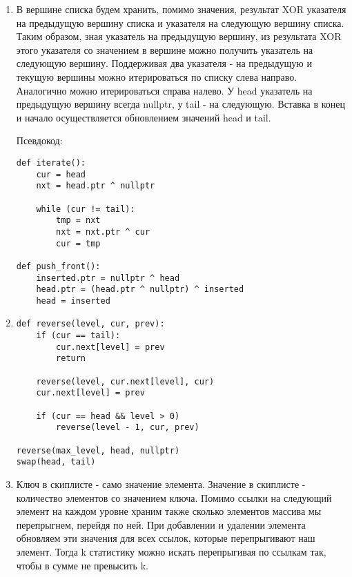 \documentclass[a4paper,12pt]{article}
\begin{document}
\lstset{language=python}

\begin{enumerate}

\item В вершине списка будем хранить, помимо значения, результат XOR указателя на предыдущую вершину списка и указателя на следующую вершину списка. Таким образом, зная указатель на предыдущую вершину, из результата XOR этого указателя со значением в вершине можно получить указатель на следующую вершину. Поддерживая два указателя - на предыдущую и текущую вершины можно итерироваться по списку слева направо. Аналогично можно итерироваться справа налево. У head указатель на предыдущую вершину всегда nullptr, у tail - на следующую.
Вставка в конец и начало осуществляется обновлением значений head и tail.

Псевдокод:
\begin{lstlisting}
def iterate():
	cur = head
	nxt = head.ptr ^ nullptr
	
	while (cur != tail):
		tmp = nxt
		nxt = nxt.ptr ^ cur
		cur = tmp
		
def push_front():
	inserted.ptr = nullptr ^ head
	head.ptr = (head.ptr ^ nullptr) ^ inserted
	head = inserted
\end{lstlisting}

\item 

\begin{lstlisting}
def reverse(level, cur, prev):
	if (cur == tail):
		cur.next[level] = prev
		return
	
	reverse(level, cur.next[level], cur)
	cur.next[level] = prev
	
	if (cur == head && level > 0)
		reverse(level - 1, cur, prev)
		
reverse(max_level, head, nullptr)
swap(head, tail)
\end{lstlisting}

\item

Ключ в скиплисте - само значение элемента. Значение в скиплисте - количество элементов со значением ключа. Помимо ссылки на следующий элемент на каждом уровне храним также сколько элементов массива мы перепрыгнем, перейдя по ней. При добавлении и удалении элемента обновляем эти значения для всех ссылок, которые перепрыгивают наш элемент. Тогда k статистику можно искать перепрыгивая по ссылкам так, чтобы в сумме не превысить k.

\end{enumerate}
\end{document}

